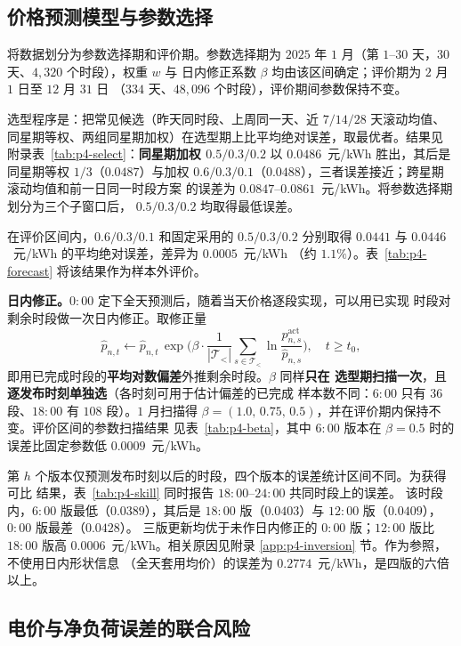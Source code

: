 \subsection{价格预测模型与参数选择}
\label{sec:p4-forecast}

将数据划分为参数选择期和评价期。参数选择期为
$2025$ 年 $1$ 月（第 $1$--$30$ 天，$30$ 天、$4{,}320$ 个时段），权重 $w$ 与
日内修正系数 $\beta$ 均由该区间确定；评价期为 $2$ 月 $1$ 日至 $12$ 月 $31$ 日
（$334$ 天、$48{,}096$ 个时段），评价期间参数保持不变。

选型程序是：把常见候选（昨天同时段、上周同一天、近 $7/14/28$ 天滚动均值、
同星期等权、两组同星期加权）在选型期上比平均绝对误差，取最优者。结果见
附录表~\ref{tab:p4-select}：\textbf{同星期加权 $0.5/0.3/0.2$} 以
$0.0486$~元/kWh 胜出，其后是同星期等权 $1/3$（$0.0487$）与加权
$0.6/0.3/0.1$（$0.0488$），三者误差接近；跨星期滚动均值和前一日同一时段方案
的误差为 $0.0847$--$0.0861$~元/kWh。将参数选择期划分为三个子窗口后，
$0.5/0.3/0.2$ 均取得最低误差。

在评价区间内，$0.6/0.3/0.1$ 和固定采用的 $0.5/0.3/0.2$ 分别取得
$0.0441$ 与 $0.0446$~元/kWh 的平均绝对误差，差异为 $0.0005$~元/kWh
（约 $1.1\%$）。表~\ref{tab:p4-forecast} 将该结果作为样本外评价。

\textbf{日内修正。}$0{:}00$ 定下全天预测后，随着当天价格逐段实现，可以用已实现
时段对剩余时段做一次日内修正。取修正量
$$
\widehat p_{n,t}\leftarrow\widehat p_{n,t}\,
\exp\!\Big(\beta\cdot\frac{1}{|\mathcal T_{<}|}\sum_{s\in\mathcal T_{<}}
\ln\frac{p_{n,s}^{\mathrm{act}}}{\widehat p_{n,s}}\Big),\quad t\ge t_0,
$$
即用已完成时段的\textbf{平均对数偏差}外推剩余时段。$\beta$ 同样\textbf{只在
选型期扫描一次}，且\textbf{逐发布时刻单独选}（各时刻可用于估计偏差的已完成
样本数不同：$6{:}00$ 只有 $36$ 段、$18{:}00$ 有 $108$ 段）。$1$ 月扫描得
$\beta=(1.0,\,0.75,\,0.5)$，并在评价期内保持不变。评价区间的参数扫描结果
见表~\ref{tab:p4-beta}，其中 $6{:}00$ 版本在 $\beta=0.5$ 时的误差比固定参数低
$0.0009$~元/kWh。

第 $h$ 个版本仅预测发布时刻以后的时段，四个版本的误差统计区间不同。为获得可比
结果，表~\ref{tab:p4-skill} 同时报告 $18{:}00$--$24{:}00$ 共同时段上的误差。
该时段内，$6{:}00$ 版最低（$0.0389$），其后是 $18{:}00$
版（$0.0403$）与 $12{:}00$ 版（$0.0409$），$0{:}00$ 版最差（$0.0428$）。
三版更新均优于未作日内修正的 $0{:}00$ 版；$12{:}00$ 版比 $18{:}00$ 版高
$0.0006$~元/kWh。相关原因见附录 \ref{app:p4-inversion} 节。作为参照，不使用日内形状信息
（全天套用均价）的误差为 $0.2774$~元/kWh，是四版的六倍以上。

\subsection{电价与净负荷误差的联合风险}
\label{sec:p4-risk}

